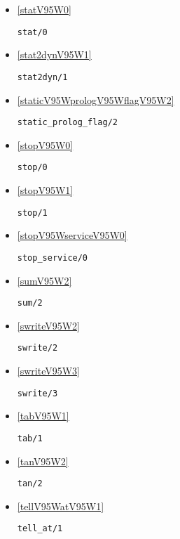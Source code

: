 \begin{itemize}
\item \ref{statV95W0} 
\begin{verbatim}
stat/0
\end{verbatim}

\item \ref{stat2dynV95W1} 
\begin{verbatim}
stat2dyn/1
\end{verbatim}

\item \ref{staticV95WprologV95WflagV95W2} 
\begin{verbatim}
static_prolog_flag/2
\end{verbatim}

\item \ref{stopV95W0} 
\begin{verbatim}
stop/0
\end{verbatim}

\item \ref{stopV95W1} 
\begin{verbatim}
stop/1
\end{verbatim}

\item \ref{stopV95WserviceV95W0} 
\begin{verbatim}
stop_service/0
\end{verbatim}

\item \ref{sumV95W2} 
\begin{verbatim}
sum/2
\end{verbatim}

\item \ref{swriteV95W2} 
\begin{verbatim}
swrite/2
\end{verbatim}

\item \ref{swriteV95W3} 
\begin{verbatim}
swrite/3
\end{verbatim}

\item \ref{tabV95W1} 
\begin{verbatim}
tab/1
\end{verbatim}

\item \ref{tanV95W2} 
\begin{verbatim}
tan/2
\end{verbatim}

\item \ref{tellV95WatV95W1} 
\begin{verbatim}
tell_at/1
\end{verbatim}


\end{itemize}
